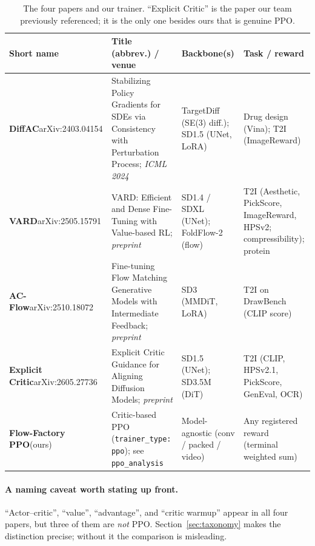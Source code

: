 \documentclass[11pt]{article}
\theoremstyle{remark}
\begin{document}
\begin{table}[h]
\centering
\small
\begin{tabular}{p{2.5cm} p{3.3cm} p{2.6cm} p{4.4cm}}
\toprule
\textbf{Short name} & \textbf{Title (abbrev.) / venue} & \textbf{Backbone(s)} & \textbf{Task / reward} \\
\midrule
\textbf{DiffAC}\newline arXiv:2403.04154 &
Stabilizing Policy Gradients for SDEs via Consistency with Perturbation Process;
\emph{ICML 2024} &
TargetDiff (SE(3) diff.); SD1.5 (UNet, LoRA) &
Drug design (Vina); T2I (ImageReward) \\
\addlinespace
\textbf{VARD}\newline arXiv:2505.15791 &
VARD: Efficient and Dense Fine-Tuning with Value-based RL; \emph{preprint} &
SD1.4 / SDXL (UNet); FoldFlow-2 (flow) &
T2I (Aesthetic, PickScore, ImageReward, HPSv2; compressibility); protein \\
\addlinespace
\textbf{AC-Flow}\newline arXiv:2510.18072 &
Fine-tuning Flow Matching Generative Models with Intermediate Feedback; \emph{preprint} &
SD3 (MMDiT, LoRA) &
T2I on DrawBench (CLIP score) \\
\addlinespace
\textbf{Explicit Critic}\newline arXiv:2605.27736 &
Explicit Critic Guidance for Aligning Diffusion Models; \emph{preprint} &
SD1.5 (UNet); SD3.5M (DiT) &
T2I (CLIP, HPSv2.1, PickScore, GenEval, OCR) \\
\addlinespace
\textbf{Flow-Factory PPO}\newline (ours) &
Critic-based PPO (\texttt{trainer\_type: ppo}); see \texttt{ppo\_analysis} &
Model-agnostic (conv / packed / video) &
Any registered reward (terminal weighted sum) \\
\bottomrule
\end{tabular}
\caption{The four papers and our trainer. ``Explicit Critic'' is the paper our team
previously referenced; it is the only one besides ours that is genuine PPO.}
\label{tab:identity}
\end{table}

\paragraph{A naming caveat worth stating up front.}
``Actor--critic'', ``value'', ``advantage'', and ``critic warmup'' appear in all four
papers, but three of them are \emph{not} PPO. Section~\ref{sec:taxonomy} makes the
distinction precise; without it the comparison is misleading.
\end{document}
